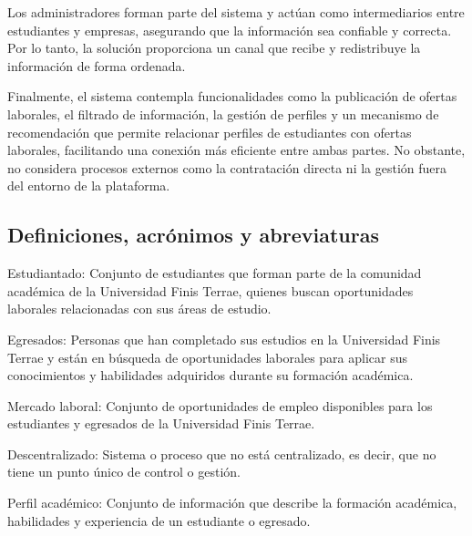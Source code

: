 \documentclass[11pt,a4paper]{Plantilla}
\begin{document}
\vspace{5pt}

Los administradores forman parte del sistema y actúan como intermediarios entre estudiantes y empresas, asegurando que la información sea confiable y correcta. Por lo tanto, la solución proporciona un canal que recibe y redistribuye la información de forma ordenada.

\vspace{5pt}

Finalmente, el sistema contempla funcionalidades como la publicación de ofertas laborales, el filtrado de información, la gestión de perfiles y un mecanismo de recomendación que permite relacionar perfiles de estudiantes con ofertas laborales, facilitando una conexión más eficiente entre ambas partes. No obstante, no considera procesos externos como la contratación directa ni la gestión fuera del entorno de la plataforma.

\subsection{Definiciones, acrónimos y abreviaturas}%
Estudiantado: Conjunto de estudiantes que forman parte de la comunidad académica de la Universidad Finis Terrae, quienes buscan oportunidades laborales relacionadas con sus áreas de estudio.

\vspace{5pt}

Egresados: Personas que han completado sus estudios en la Universidad Finis Terrae y están en búsqueda de oportunidades laborales para aplicar sus conocimientos y habilidades adquiridos durante su formación académica.

\vspace{5pt}

Mercado laboral: Conjunto de oportunidades de empleo disponibles para los estudiantes y egresados de la Universidad Finis Terrae.

\vspace{5pt}

Descentralizado: Sistema o proceso que no está centralizado, es decir, que no tiene un punto único de control o gestión.

\vspace{5pt}

Perfil académico: Conjunto de información que describe la formación académica, habilidades y experiencia de un estudiante o egresado.


\vspace{5pt}
\end{document}
